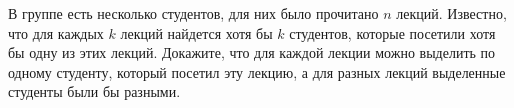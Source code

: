 В группе есть несколько студентов, для них было прочитано $n$ лекций. Известно, что для каждых $k$ лекций найдется хотя бы
$k$ студентов, которые посетили хотя бы одну из этих лекций. Докажите, что для каждой лекции можно выделить по одному
студенту, который посетил эту лекцию, а для разных лекций выделенные студенты были бы разными.